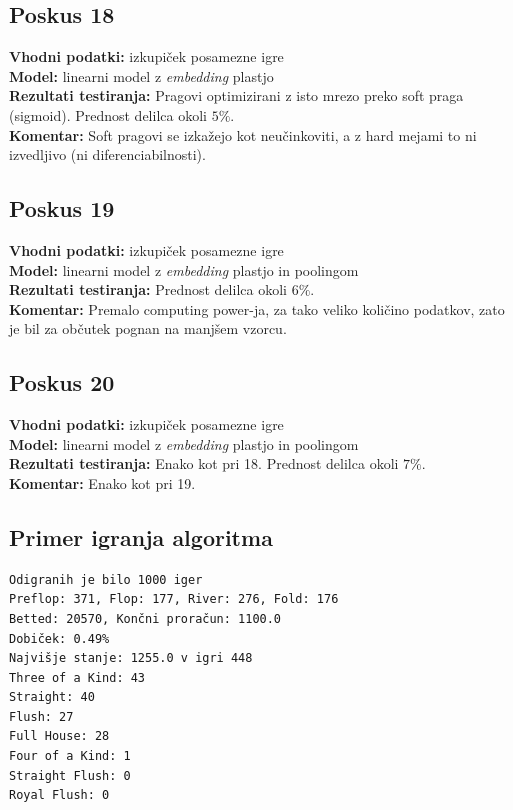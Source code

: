 \documentclass[a4paper,12pt]{article}
\begin{document}
\subsection{Poskus 18}
\textbf{Vhodni podatki:} izkupiček posamezne igre \\
\textbf{Model:} linearni model z \textit{embedding} plastjo \\
\textbf{Rezultati testiranja:} Pragovi optimizirani z isto mrezo preko soft praga (sigmoid). Prednost delilca okoli $5\%$.\\
\textbf{Komentar:} Soft pragovi se izkažejo kot neučinkoviti, a z hard mejami to ni izvedljivo (ni diferenciabilnosti).

\subsection{Poskus 19}
\textbf{Vhodni podatki:} izkupiček posamezne igre \\
\textbf{Model:} linearni model z \textit{embedding} plastjo in poolingom \\
\textbf{Rezultati testiranja:} Prednost delilca okoli $6\%$.\\
\textbf{Komentar:} Premalo computing power-ja, za tako veliko količino podatkov, zato je bil za občutek pognan na manjšem vzorcu.

\subsection{Poskus 20}
\textbf{Vhodni podatki:} izkupiček posamezne igre \\
\textbf{Model:} linearni model z \textit{embedding} plastjo in poolingom \\
\textbf{Rezultati testiranja:} Enako kot pri 18. Prednost delilca okoli $7\%$.\\
\textbf{Komentar:} Enako kot pri 19.

\subsection*{Primer igranja algoritma}
\begin{verbatim}
Odigranih je bilo 1000 iger
Preflop: 371, Flop: 177, River: 276, Fold: 176
Betted: 20570, Končni proračun: 1100.0
Dobiček: 0.49%
Najvišje stanje: 1255.0 v igri 448
Three of a Kind: 43
Straight: 40
Flush: 27
Full House: 28
Four of a Kind: 1
Straight Flush: 0
Royal Flush: 0
\end{verbatim}
\end{document}
